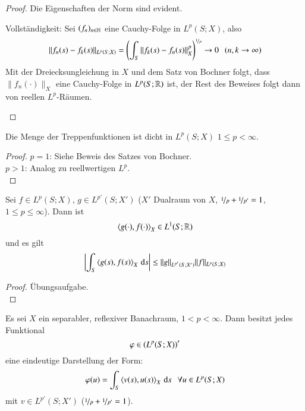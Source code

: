 \begin{proof}
    Die Eigenschaften der Norm sind evident.
    \begin{description}
    \item{Vollständigkeit:} Sei $(f_n)_{n\in\mathbb{N}}$ eine Cauchy-Folge in $L^p(S;X)$, also
    \[
        \|f_n(s)-f_k(s)\|_{L^p(S;X)} = \left( \int_S \|f_k(s)-f_n(s)\|_X^p\right)^{\nicefrac1p} \rightarrow 0
        \hspace{.25cm} (n,k\rightarrow \infty)
    \]
    Mit der Dreiecksungleichung in $X$ und dem Satz von Bochner folgt, dass $\|f_n(\cdot)\|_X$ eine
    Cauchy-Folge in $L^p(S;\mathbb{R})$ ist, der Rest des Beweises folgt dann von reellen $L^p$-Räumen.
    \end{description}
    \[ \]
\end{proof}

\begin{lem}\label{4.30}
    Die Menge der Treppenfunktionen ist dicht in $L^p(S;X)$ $1\leq p <\infty$.
\end{lem}

\begin{proof}
    $p=1$: Siehe Beweis des Satzes von Bochner.\\
    $p>1$: Analog zu reellwertigen $L^p$. \[ \]
\end{proof}

\begin{theorem}\label{4.31}
    Sei $f\in L^p(S;X)$, $g\in L^{p'}(S;X')$ ($X'$ Dualraum von $X$, $\nicefrac1p+\nicefrac1{p'}=1$, 
    $1\leq p \leq \infty$). Dann ist
    \[
        \left\langle g(\cdot), f(\cdot)\right\rangle _X\in L^1(S;\mathbb{R})
    \]
    und es gilt
    \[
        \left| \int_S\left\langle g(s),f(s)\right\rangle_X\, \mathrm{d} s \right| \leq \|g\|_{L^{p'}(S;X')}\|f\|_{L^p(S;X)}
    \]
\end{theorem}

\begin{proof}
    Übungsaufgabe. \[ \]
\end{proof}

\begin{theorem}[Darstellungssatz]\label{4.32}
    Es sei $X$ ein separabler, reflexiver Banachraum, $1<p<\infty$. Dann besitzt jedes Funktional
    \[
        \varphi \in \left( L^p(S;X)\right)'
    \]
    eine eindeutige Darstellung der Form:
    \[
        \varphi (u) = \int_S\left\langle v(s),u(s)\right\rangle_X \, \mathrm{d} s \hspace{.25cm} \forall u\in L^p(S;X)
    \]
    mit $v\in L^{p'}(S;X')$ ($\nicefrac1p+\nicefrac1{p'}=1$).
\end{theorem}

